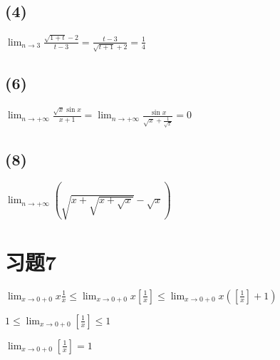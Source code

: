 \documentclass[a4paper,11pt]{article}
\newcommand{\Limit}{\displaystyle \lim_{n \rightarrow +\infty}}
\begin{document}
\subsection*{(4)}
$\displaystyle \lim_{n \to 3} \frac{\sqrt{1+t}-2}{t-3} = \frac{t-3}{\sqrt{t+1}+2} = \frac{1}{4}$
\subsection*{(6)}
$\Limit \frac{\sqrt{x}\sin x}{x+1} = \Limit \frac{\sin x}{\sqrt{x} + \frac{1}{\sqrt{x}}} = 0$
\subsection*{(8)}
$\Limit (\sqrt{x+\sqrt{x+\sqrt{x}}} - \sqrt{x})$
\section*{习题7}
$\displaystyle \lim_{x\to 0+0}x\frac{1}{x} \le \lim_{x \to 0+0} x[\frac{1}{x}] \le \lim_{x\to 0+0}x([\frac{1}{x}]+1)$

$\displaystyle 1 \le \lim_{x\to 0+0}[\frac{1}{x}] \le 1$

$\displaystyle \lim_{x\to 0+0}[\frac{1}{x}] = 1$
\end{document}
